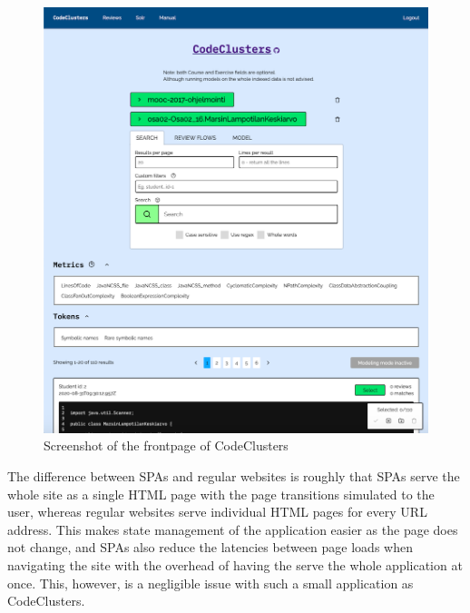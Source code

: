 \begin{figure}
\begin{center}
\includegraphics{images/cc-frontpage.png}
\caption{Screenshot of the frontpage of CodeClusters \label{fig:cc-frontpage}}
\end{center}
\end{figure}

The difference between SPAs and regular websites is roughly that SPAs serve the whole site as a single HTML page with the page transitions simulated to the user, whereas regular websites serve individual HTML pages for every URL address. This makes state management of the application easier as the page does not change, and SPAs also reduce the latencies between page loads when navigating the site with the overhead of having the serve the whole application at once. This, however, is a negligible issue with such a small application as CodeClusters.

